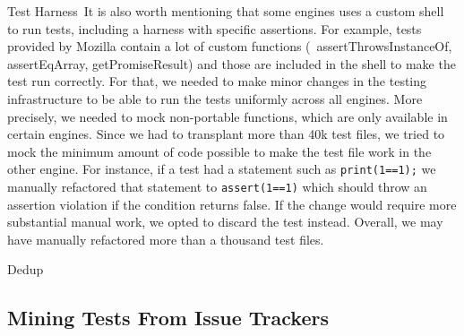 \documentclass[smallextended]{svjour3}
\begin{document}
\lbrack{}Test Harness\rbrack{}~It is also worth mentioning that some
engines uses a custom shell to run tests, including a harness with
specific assertions. For example, tests provided by Mozilla contain a lot
of custom functions (\eg\ assertThrowsInstanceOf, assertEqArray, getPromiseResult)
and those are included in the shell to make the test run correctly.
For that, we needed to make minor changes in the testing infrastructure to be able
to run the tests uniformly across all engines. More precisely, we
needed to mock non-portable functions, which are only available in
certain engines. Since we had to transplant more than 40k test files,
we tried to mock the minimum amount of code possible to make the test
file work in the other engine.  For instance, if a test had a statement such as
\texttt{print(1==1);} we manually refactored that statement to
\texttt{assert(1==1)} which should throw an assertion violation if the condition returns false.
If the change would require more substantial manual work, we opted to discard the test instead. Overall,
we may have manually refactored more than a thousand test files.

\lbrack{}Dedup\rbrack{}~

\subsection{Mining Tests From Issue Trackers}



\end{document}
